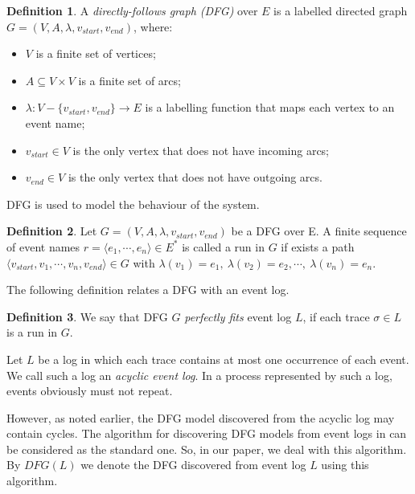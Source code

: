 \documentclass[11pt]{article}
\theoremstyle{definition}
\newtheorem{definition}{Definition}
\begin{document}
\begin{definition}%
A \textit{directly-follows graph (DFG)} over $E$ is a labelled directed graph $G = (V, A, \lambda, v_{start}, v_{end})$, where:
\begin{itemize}
    \item $V$ is a finite set of vertices;
    \item $A \subseteq V \times V$ is a finite set of arcs;
    \item $\lambda: V - \{v_{start}, v_{end}\} \rightarrow E$ is a labelling function that maps each  vertex to an event name;
    \item $v_{start} \in V$ is the only vertex that does not have incoming arcs;
    \item $v_{end} \in V$ is the only vertex that does not have outgoing arcs.
\end{itemize}
\end{definition}


DFG is used to model the behaviour of the system. 

\begin{definition}%
Let $G = (V, A, \lambda, v_{start}, v_{end})$ be a DFG over E.
A finite sequence of event names $r = \langle e_1, \cdots, e_n \rangle \in E^*$ is called a run in $G$ if exists a path $\langle v_{start}, v_1, \cdots, v_n, v_{end} \rangle \in G$ with $\lambda(v_1) = e_1,\ \lambda(v_2) = e_2, \cdots,\ \lambda(v_n) = e_n$.
\end{definition}

The following definition relates a DFG with an event log.

\begin{definition}%
We say that DFG $G$ \textit{perfectly fits} event log $L$, if each trace $\sigma \in L$ is a run in $G$.
\end{definition}

Let $L$ be a log in which each trace contains at most one occurrence of each event. We call such a log an \textit{acyclic event log}. In a process represented by such a log, events obviously must not repeat. 

However, as noted earlier, the DFG model discovered from the acyclic log may contain cycles. 
The algorithm for discovering DFG models from event logs in \citep{vanderAalst2022} can be considered as the standard one. So, in our paper, we deal with this algorithm.  
By $DFG(L)$ we denote the DFG  discovered from event log $L$ using this algorithm.
\end{document}
